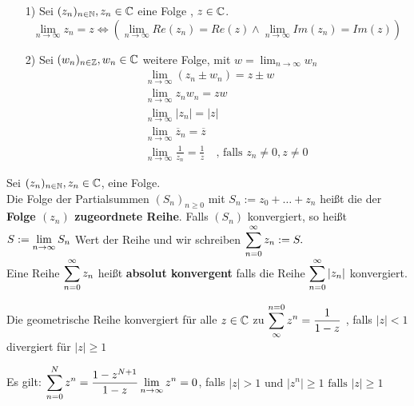 \begin{bemerkung}
\leavevmode
\begin{itemize}
	\item[1)] Sei $(z_n)_{n\in\mathbb{N}},z_n \in \mathbb{C}$ eine Folge , $z \in \mathbb{C}$.
	\[\lim_{n\to\infty} z_n = z \Leftrightarrow (\lim_{n\to\infty}Re(z_n)=Re(z) \land\lim_{n\to\infty}Im(z_n)=Im(z)) \]
	\item[2)] Sei $(w_n)_{n\in\mathbb{Z}},w_n \in \mathbb{C}$ weitere Folge, mit $w = \lim_{n \to \infty} w_n$
	\begin{eqnarray*}
		&&\lim_{n \to \infty}(z_n \pm w_n) = z \pm w\\
		&&\lim_{n \to \infty}z_nw_n = zw\\
		&&\lim_{n \to \infty}|z_n| = |z| \\
		&&\lim_{n \to \infty}\overline{z}_n = \overline{z} \\
		&&\lim_{n \to \infty} \frac{1}{z_n}= \frac{1}{z}\quad \text{, falls } z_n \neq 0, z\neq 0
	\end{eqnarray*}
\end{itemize}
\end{bemerkung}

\begin{definition}
Sei $(z_n)_{n\in\mathbb{N}}, z_n \in \mathbb{C}$, eine Folge.\\
Die Folge der Partialsummen $(S_n)_{n\geq 0}$ mit $S_n := z_0+\dots+z_n$ heißt die der \textbf{Folge $(z_n)$ zugeordnete Reihe}.
Falls $(S_n)$ konvergiert, so heißt 
$\begin{displaystyle}
	S:=\lim_{n\to \infty} S_n
\end{displaystyle} $ Wert der Reihe und wir schreiben $\begin{displaystyle}
	\sum^\infty_{n=0}z_n := S.
\end{displaystyle}$\\
Eine Reihe 
$\begin{displaystyle}
\sum^\infty_{n=0} z_n
\end{displaystyle}$ heißt \textbf{absolut konvergent} falls die Reihe 
$\begin{displaystyle}
\sum^\infty_{n=0} |z_n|
\end{displaystyle}$ konvergiert.
\end{definition}

\begin{beispiel}
Die geometrische Reihe konvergiert für alle $z \in \mathbb{C}$ zu
$\begin{displaystyle}
	\sum_{\infty}^{n=0} z^n = \frac{1}{1-z}
\end{displaystyle}$
, falls $|z| <  1$ divergiert für $|z| \ge 1$
\end{beispiel}
\begin{bew}
	Es gilt: 
	$\begin{displaystyle}
	\sum_{n=0}^{N} z^n = \frac{1- z^{N+1}}{1-z}\\
	\lim_{n \to \infty} z^n = 0
	\end{displaystyle}$, falls $|z| > 1 \text{ und } |z^n| \ge 1 \text{ falls } |z| \ge 1$
\end{bew}

